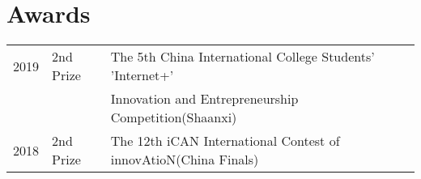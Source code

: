 \documentclass[]{deedy-resume-openfont}
\begin{document}
\begin{minipage}[t]{0.73\textwidth}

\section{Awards} 
\begin{tabular}{rll}
    2019         & 2nd Prize  & The 5th China International College Students' 'Internet+' \\
                 &            & Innovation and Entrepreneurship Competition(Shaanxi) \\
    2018	     & 2nd Prize  & The 12th iCAN International Contest of innovAtioN(China Finals) \\
\end{tabular}
\sectionsep


% 
% 

\end{minipage} 
\end{document}
